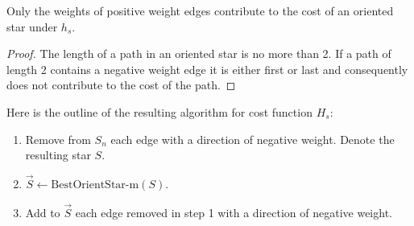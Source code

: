   \begin{lemma}
  	Only  the weights of positive weight edges contribute to the cost of an oriented star 
  	under $h_s$.
  \end{lemma} 
\begin{proof}
	The length of a path in an oriented star is no more than 2. If a path of length 2 contains a negative weight edge it is either first or last and consequently does not contribute to the cost of the path. 
\end{proof}

Here is the outline of the resulting algorithm for cost function $H_s$:
\begin{enumerate}
	\item Remove from $S_n$ each edge with a direction of negative weight. Denote the resulting star $S$.
	\item $\vec{S}\leftarrow \mbox{BestOrientStar-m} (S)$.
	\item Add to $\vec{S}$ each edge removed in step 1 with a direction of negative weight.
\end{enumerate}
